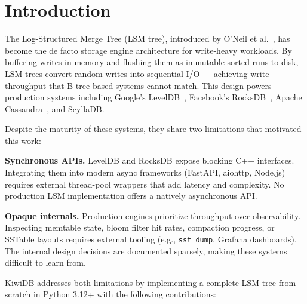 \documentclass[conference]{IEEEtran}
\begin{document}
\section{Introduction}

The Log-Structured Merge Tree (LSM tree), introduced by O'Neil et al.~\cite{oneil1996}, has become the de facto storage engine architecture for write-heavy workloads. By buffering writes in memory and flushing them as immutable sorted runs to disk, LSM trees convert random writes into sequential I/O --- achieving write throughput that B-tree based systems cannot match. This design powers production systems including Google's LevelDB~\cite{leveldb}, Facebook's RocksDB~\cite{rocksdb}, Apache Cassandra~\cite{cassandra}, and ScyllaDB.

Despite the maturity of these systems, they share two limitations that motivated this work:

\textbf{Synchronous APIs.} LevelDB and RocksDB expose blocking C++ interfaces. Integrating them into modern async frameworks (FastAPI, aiohttp, Node.js) requires external thread-pool wrappers that add latency and complexity. No production LSM implementation offers a natively asynchronous API.

\textbf{Opaque internals.} Production engines prioritize throughput over observability. Inspecting memtable state, bloom filter hit rates, compaction progress, or SSTable layouts requires external tooling (e.g., \texttt{sst\_dump}, Grafana dashboards). The internal design decisions are documented sparsely, making these systems difficult to learn from.

KiwiDB addresses both limitations by implementing a complete LSM tree from scratch in Python 3.12+ with the following contributions:
\end{document}
